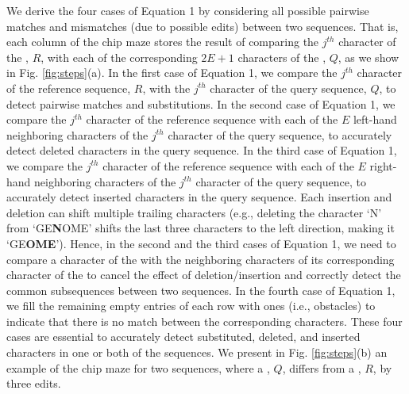 We derive {the four cases of Equation 1} by considering  all possible pairwise matches and mismatches (due to possible edits) between two sequences. That is, each column of the chip maze stores the result of comparing the $j^{th}$ character of the , $R$, with each of {the} corresponding $2E+1$ characters of the , $Q${, as we show in Fig.} \ref{fig:steps}(a). 
{In the first case of Equation 1, we compare the $j^{th}$ character of the reference sequence, $R$, with the $j^{th}$ character of the query sequence, $Q$, to detect pairwise matches and substitutions.
In the second case of Equation 1, we compare the $j^{th}$ character of the reference sequence with each of the $E$ left-hand neighboring characters of the $j^{th}$ character of the query sequence, to accurately detect deleted characters in the query {sequence}.
In the third case of Equation 1, we compare the $j^{th}$ character of the reference sequence with each of the $E$ right-hand neighboring characters of the $j^{th}$ character of the query sequence, to accurately detect inserted characters in the query {sequence}}. 
Each insertion and deletion can shift multiple trailing characters (e.g., deleting the character \lq{N}\rq{} from \lq{GE\textbf{N}OME}\rq{} shifts the last three characters to the left direction, making it \lq{GE\textbf{OME}}\rq{}). {Hence, in the second and the third cases of Equation 1,} we need to compare a character of the  with the neighboring characters of its corresponding character of the  to cancel the effect of deletion/insertion and correctly detect the common subsequences between two sequences. 
{In the fourth case of Equation 1,} we fill the remaining empty entries of each row {with} ones (i.e., obstacles) to indicate that there is no match between the corresponding characters.
{These four cases are essential to accurately detect} substituted, deleted, and inserted characters in one or both {of the} sequences. 
We present in Fig. \ref{fig:steps}(b) an example of the chip maze for two sequences, where a , $Q$, differs from a , $R$, by three edits. 


